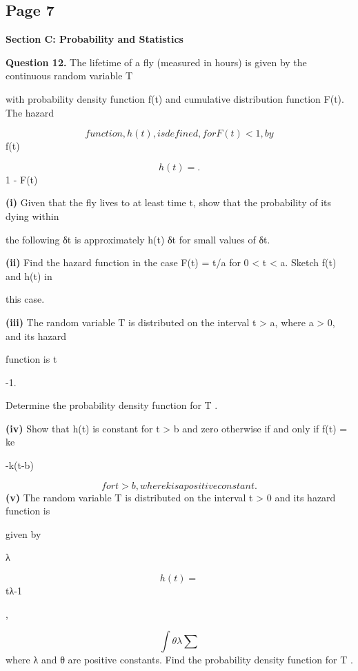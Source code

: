 \documentclass[12pt]{article}
\begin{document}
\subsection*{Page 7}
\begin{flushleft}
\bigskip\textbf{Section C: Probability and Statistics}\par
\bigskip\textbf{Question 12.} The lifetime of a fly (measured in hours) is given by the continuous random variable T\par
with probability density function f(t) and cumulative distribution function F(t). The hazard\par
\[function, h(t), is defined, for F(t) < 1, by\]
f(t)\par
\[h(t) = .\]
1 - F(t)\par
\textbf{(i)} Given that the fly lives to at least time t, show that the probability of its dying within\par
the following δt is approximately h(t) δt for small values of δt.\par
\textbf{(ii)} Find the hazard function in the case F(t) = t/a for 0 < t < a. Sketch f(t) and h(t) in\par
this case.\par
\textbf{(iii)} The random variable T is distributed on the interval t > a, where a > 0, and its hazard\par
function is t\par
-1.\par
Determine the probability density function for T .\par
\textbf{(iv)} Show that h(t) is constant for t > b and zero otherwise if and only if f(t) = ke\par
-k(t-b)\par
\[for t > b, where k is a positive constant.\]
\textbf{(v)} The random variable T is distributed on the interval t > 0 and its hazard function is\par
given by\par
λ\par
\[h(t) =\]
tλ-1\par
,\par
\[\int θλ \sum\]
where λ and θ are positive constants. Find the probability density function for T .\par
\end{flushleft}
\end{document}
